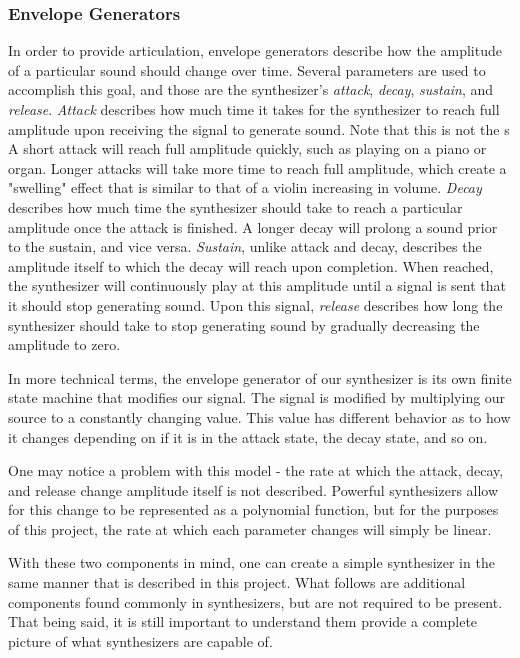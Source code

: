 \documentclass[12pt]{article}
\begin{document}
\subsubsection{Envelope Generators}
In order to provide articulation, envelope generators describe how the amplitude of a particular sound should change over time. Several parameters are used to accomplish this goal, and those are the synthesizer's \textit{attack}, \textit{decay}, \textit{sustain}, and \textit{release}. \textit{Attack} describes how much time it takes for the synthesizer to reach full amplitude upon receiving the signal to generate sound. Note that this is not the s A short attack will reach full amplitude quickly, such as playing on a piano or organ. Longer attacks will take more time to reach full amplitude, which create a "swelling" effect that is similar to that of a violin increasing in volume. \textit{Decay} describes how much time the synthesizer should take to reach a particular amplitude once the attack is finished. A longer decay will prolong a sound prior to the sustain, and vice versa. \textit{Sustain}, unlike attack and decay, describes the amplitude itself to which the decay will reach upon completion. When reached, the synthesizer will continuously play at this amplitude until a signal is sent that it should stop generating sound. Upon this signal, \textit{release} describes how long the synthesizer should take to stop generating sound by gradually decreasing the amplitude to zero. 

In more technical terms, the envelope generator of our synthesizer is its own finite state machine that modifies our signal. The signal is modified by multiplying our source to a constantly changing value. This value has different behavior as to how it changes depending on if it is in the attack state, the decay state, and so on.  

One may notice a problem with this model - the rate at which the attack, decay, and release change amplitude itself is not described. Powerful synthesizers allow for this change to be represented as a polynomial function, but for the purposes of this project, the rate at which each parameter changes will simply be linear. 

With these two components in mind, one can create a simple synthesizer in the same manner that is described in this project. What follows are additional components found commonly in synthesizers, but are not required to be present. That being said, it is still important to understand them provide a complete picture of what synthesizers are capable of. 
\end{document}
